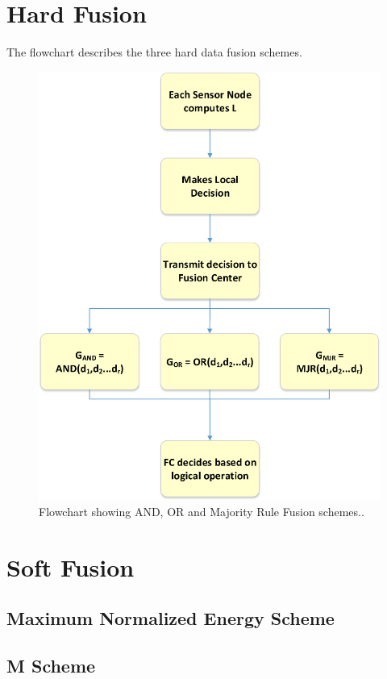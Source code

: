 \section{Hard Fusion}
\label{hardfusion}
The flowchart describes the three hard data fusion schemes.
\begin{figure}[ht!]
	\centering
	\includegraphics[width=\textwidth,keepaspectratio]{images/Gill/figs/hardfusion.eps}
    \caption{Flowchart showing AND, OR and Majority Rule Fusion schemes..} 
\label{expsetup}      
\end{figure}


\section{Soft Fusion}

\subsection{Maximum Normalized Energy Scheme}

\subsection{M Scheme}

